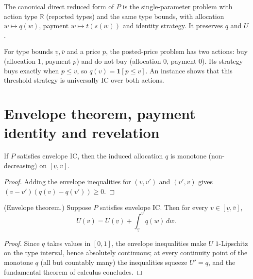 \begin{definition}\label{def:MathEconLib.SingleParameterProblem.reduce}\leanok
{}
The canonical direct reduced form of $P$ is the single-parameter problem with action type $\mathbb{R}$ (reported types) and the same type bounds, with allocation $w\mapsto q(w)$, payment $w\mapsto t(s(w))$ and identity strategy. It preserves $q$ and $U$.
\end{definition}

\begin{definition}\label{def:MathEconLib.SingleParameterProblem.postedPriceProblem}\leanok
{}
For type bounds $\underline v,\overline v$ and a price $p$, the posted-price problem has two actions: buy (allocation $1$, payment $p$) and do-not-buy (allocation $0$, payment $0$). Its strategy buys exactly when $p\le v$, so $q(v)=\mathbf 1[p\le v]$. An instance shows that this threshold strategy is universally IC over both actions.
\end{definition}

\section{Envelope theorem, payment identity and revelation}

\begin{lemma}\label{thm:MathEconLib.SingleParameterProblem.q_monotoneOn}\leanok
{}
If $P$ satisfies envelope IC, then the induced allocation $q$ is monotone (non-decreasing) on $[\underline v,\overline v]$.
\end{lemma}
\begin{proof}\leanok
Adding the envelope inequalities for $(v,v')$ and $(v',v)$ gives $(v-v')(q(v)-q(v'))\ge0$.
\end{proof}

\begin{theorem}\label{thm:MathEconLib.SingleParameterProblem.integral_rep}\leanok
{}
(Envelope theorem.) Suppose $P$ satisfies envelope IC. Then for every $v\in[\underline v,\overline v]$,
\[
U(v)=U(\underline v)+\int_{\underline v}^{v}q(w)\,dw .
\]
\end{theorem}
\begin{proof}\leanok
{}
Since $q$ takes values in $[0,1]$, the envelope inequalities make $U$ $1$-Lipschitz on the type interval, hence absolutely continuous; at every continuity point of the monotone $q$ (all but countably many) the inequalities squeeze $U'=q$, and the fundamental theorem of calculus concludes.
\end{proof}

